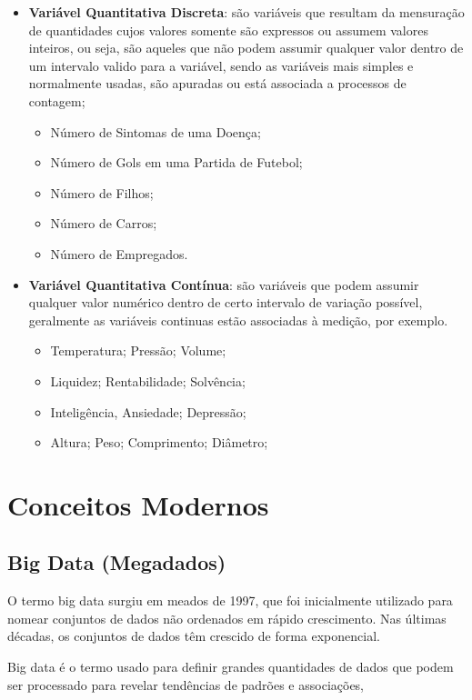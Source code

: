 \begin{itemize}
  \item \textbf{Variável Quantitativa Discreta}: são variáveis que resultam da mensuração de quantidades cujos valores somente são expressos ou assumem valores inteiros, ou seja, são aqueles que não podem assumir qualquer valor dentro de um intervalo valido para a variável, sendo as variáveis mais simples e normalmente usadas, são apuradas ou está associada a processos de contagem;

 \begin{itemize}
   \item Número de Sintomas de uma Doença;
   \item Número de Gols em uma Partida de Futebol;
   \item Número de Filhos;
   \item Número de Carros;
   \item Número de Empregados.
 \end{itemize}
  \item \textbf{Variável Quantitativa Contínua}: são variáveis que podem assumir qualquer valor numérico dentro de certo intervalo de variação possível, geralmente as variáveis continuas estão associadas à medição, por exemplo.
\begin{itemize}
  \item Temperatura; Pressão; Volume;
  \item Liquidez; Rentabilidade; Solvência;
  \item Inteligência, Ansiedade; Depressão;
  \item Altura; Peso; Comprimento; Diâmetro;
\end{itemize}
\end{itemize}



\section{Conceitos Modernos}

\subsection{Big Data (Megadados)}
O termo big data surgiu em meados de 1997, que foi inicialmente utilizado para nomear conjuntos de dados não ordenados em rápido crescimento. Nas últimas décadas, os conjuntos de dados têm crescido de forma exponencial.\vst

Big data é o termo usado para definir grandes quantidades de dados que podem ser processado para revelar tendências de padrões e associações,


